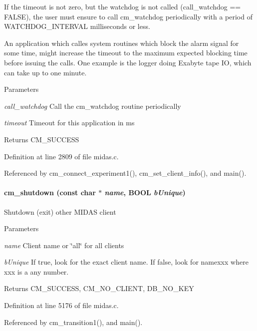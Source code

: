 If the timeout is not zero, but the watchdog is not called (call\_\-watchdog == FALSE), the user must ensure to call cm\_\-watchdog periodically with a period of WATCHDOG\_\-INTERVAL milliseconds or less.

An application which calles system routines which block the alarm signal for some time, might increase the timeout to the maximum expected blocking time before issuing the calls. One example is the logger doing Exabyte tape IO, which can take up to one minute. 
\begin{DoxyParams}{Parameters}
\item[{\em call\_\-watchdog}]Call the cm\_\-watchdog routine periodically \item[{\em timeout}]Timeout for this application in ms \end{DoxyParams}
\begin{DoxyReturn}{Returns}
CM\_\-SUCCESS 
\end{DoxyReturn}


Definition at line 2809 of file midas.c.

Referenced by cm\_\-connect\_\-experiment1(), cm\_\-set\_\-client\_\-info(), and main().
\paragraph[{cm\_\-shutdown}]{ cm\_\-shutdown (const char $\ast$ {\em name}, \/  {\bf BOOL} {\em bUnique})}\hfill\label{group__cmfunctionc_ga01682993f1aa1d5a4ed22de45ecf45fe}
Shutdown (exit) other MIDAS client 
\begin{DoxyParams}{Parameters}
\item[{\em name}]Client name or \char`\"{}all\char`\"{} for all clients \item[{\em bUnique}]If true, look for the exact client name. If false, look for namexxx where xxx is a any number.\end{DoxyParams}
\begin{DoxyReturn}{Returns}
CM\_\-SUCCESS, CM\_\-NO\_\-CLIENT, DB\_\-NO\_\-KEY 
\end{DoxyReturn}


Definition at line 5176 of file midas.c.

Referenced by cm\_\-transition1(), and main().

